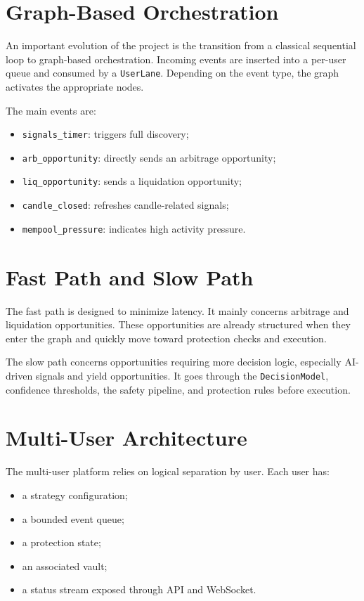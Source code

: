 \documentclass[12pt,a4paper]{report}
\begin{document}
\section{Graph-Based Orchestration}

An important evolution of the project is the transition from a classical sequential loop to graph-based orchestration. Incoming events are inserted into a per-user queue and consumed by a \texttt{UserLane}. Depending on the event type, the graph activates the appropriate nodes.

The main events are:
\begin{itemize}
    \item \texttt{signals\_timer}: triggers full discovery;
    \item \texttt{arb\_opportunity}: directly sends an arbitrage opportunity;
    \item \texttt{liq\_opportunity}: sends a liquidation opportunity;
    \item \texttt{candle\_closed}: refreshes candle-related signals;
    \item \texttt{mempool\_pressure}: indicates high activity pressure.
\end{itemize}

\section{Fast Path and Slow Path}

The fast path is designed to minimize latency. It mainly concerns arbitrage and liquidation opportunities. These opportunities are already structured when they enter the graph and quickly move toward protection checks and execution.

The slow path concerns opportunities requiring more decision logic, especially AI-driven signals and yield opportunities. It goes through the \texttt{DecisionModel}, confidence thresholds, the safety pipeline, and protection rules before execution.

\section{Multi-User Architecture}

The multi-user platform relies on logical separation by user. Each user has:
\begin{itemize}
    \item a strategy configuration;
    \item a bounded event queue;
    \item a protection state;
    \item an associated vault;
    \item a status stream exposed through API and WebSocket.
\end{itemize}
\end{document}
